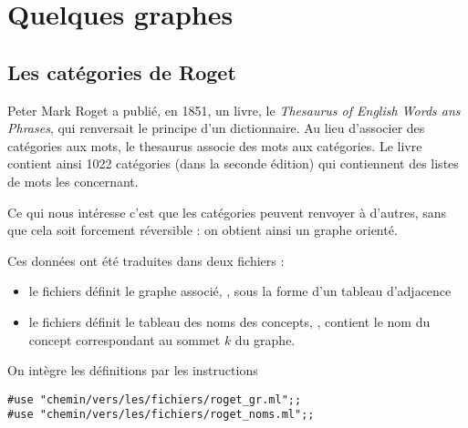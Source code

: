 \newpage

\section{Quelques graphes} 
\subsection{Les catégories de Roget} 
Peter Mark Roget a publié, en 1851, un livre, le {\it Thesaurus of English Words ans Phrases}, qui renversait le principe d'un dictionnaire. Au lieu d'associer des catégories aux mots, le thesaurus associe des mots aux catégories. Le livre contient ainsi 1022 catégories (dans la seconde édition) qui contiennent des listes de mots les concernant.

Ce qui nous intéresse c'est que les catégories peuvent renvoyer à d'autres, sans que cela soit forcement réversible : on obtient ainsi un graphe orienté.

Ces données ont été traduites dans deux fichiers :
\begin{itemize}
    \item le fichiers  définit le graphe associé, , sous la forme d'un tableau d'adjacence
    \item le fichiers  définit le tableau des noms des concepts, ,  contient le nom du concept correspondant au sommet $k$ du graphe.
\end{itemize}

On intègre les définitions par les instructions

\begin{lstlisting}
#use "chemin/vers/les/fichiers/roget_gr.ml";;
#use "chemin/vers/les/fichiers/roget_noms.ml";;
\end{lstlisting}

